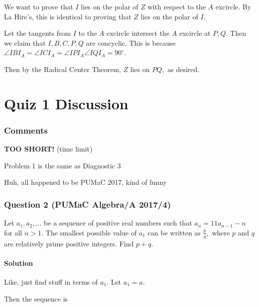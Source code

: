 \documentclass{article}
\begin{document}
\pagebreak

\begin{sol}{}{}
We want to prove that $I$ lies on the polar of $Z$ with respect to the $A$ excircle. By La Hire's, this is identical to proving that $Z$ lies on the polar of $I.$
    
    Let the tangents from $I$ to the $A$ excircle intersect the $A$ excircle at $P,Q.$ Then we claim that $I,B,C,P,Q$ are concyclic. This is because $\angle IBI_A=\angle ICI_A=\angle IPI_A\angle IQI_A=90^{\circ}.$
    
    Then by the Radical Center Theorem, $Z$ lies on $PQ,$ as desired.
\end{sol}

\pagebreak

 \part{Quiz 1 Discussion}
 
 \setcounter{section}{0}
 \section{Comments}
 
\begin{itemize}

	\Item \textbf{TOO SHORT!} (time limit)

	\Item Problem 1 is the same as Diagnostic 3

	\Item Huh, all happened to be PUMaC 2017, kind of funny

\end{itemize}
\pagebreak


\section{Question 2 (PUMaC Algebra/A 2017/4)}

Let $a_1,a_2,\dots$ be a sequence of positive real numbers such that $a_n=11a_{n-1}-n$ for all $n>1.$ The smallest possible value of $a_1$ can be written as $\frac{p}{q},$ where $p$ and $q$ are relatively prime positive integers. Find $p+q.$

\subsection{Solution}

Like, just find stuff in terms of $a_1.$ Let $a_1=a.$

Then the sequence is
\end{document}
